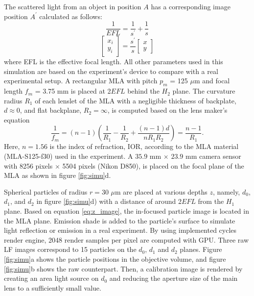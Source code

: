 \documentclass[draftthesis,fullpage]{uiucthesis}
\begin{document}
The scattered light from an object in position $A$ has a corresponding image position $A^{\prime}$ calculated as follows:
\begin{equation}
  \frac{1}{EFL} = \frac{1}{s^{\prime}} + \frac{1}{s}
\label{eq:z_image}
\end{equation}
\begin{equation}
  \left[\begin{array}{c}
    {x_i} \\
    {y_i}
    \end{array}\right]=\frac{s^{\prime}}{s}\left[\begin{array}{c}
    x \\
    y
    \end{array}\right] 
  \label{eq:xy_image}
\end{equation}
where EFL is the effective focal length. All other parameters used in this simulation are based on the experiment's device to compare with a real experimental setup. A rectangular MLA with pitch $p_m$ = 125 $\mu$m and focal length $f_m$ = 3.75 mm is placed at 2$EFL$ behind the $H_2$ plane. The curvature radius $R_1$ of each lenslet of the MLA with a negligible thickness of backplate, $d \approx 0$, and flat backplane, $R_2 = \infty$, is computed based on the lens maker's equation
\begin{equation}
  \frac{1}{f_m}=(n-1)\left(\frac{1}{R_{1}}-\frac{1}{R_{2}}+\frac{(n-1) d}{n R_{1} R_{2}}\right)=\frac{n-1}{R_{1}}.
\label{eq:lensmaker}
\end{equation}
Here, $n = 1.56$ is the index of refraction, IOR, according to the MLA material (MLA-S125-f30) used in the experiment. A $35.9$ mm $\times$ $23.9$ mm camera sensor with 8256 pixels $\times$ 5504 pixels (Nikon D850), is placed on the focal plane of the MLA as shown in figure \ref{fig:simu}d.

Spherical particles of radius $r=30$ $\mu$m are placed at various depths $z$, namely, $d_0$, $d_1$,  and $d_2$ in figure \ref{fig:simu}d) with a distance of around 2$EFL$ from the $H_1$ plane. Based on equation \ref{eq:z_image}, the in-focused particle image is located in the MLA plane. Emission shade is added to the particle's surface to simulate light reflection or emission in a real experiment. By using implemented cycles render engine, 2048 render samples per pixel are computed with GPU. Three raw LF images correspond to 15 particles on the $d_0$, $d_1$ and $d_2$ planes. Figure \ref{fig:simu}a shows the particle positions in the objective volume, and figure \ref{fig:simu}b shows the raw counterpart. Then, a calibration image is rendered by creating an area light source on $d_0$ and reducing the aperture size of the main lens to a sufficiently small value. 
\end{document}
